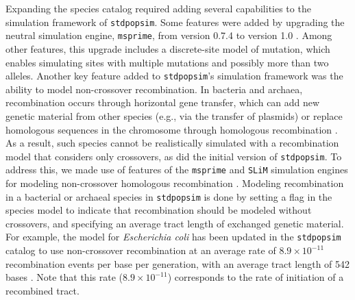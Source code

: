 \documentclass[hidelinks]{article}
\newcommand{\stdpopsim}{\texttt{stdpopsim}\xspace}
\begin{document}
Expanding the species catalog required adding several capabilities to the simulation framework of \stdpopsim.
Some features were added by upgrading the neutral simulation engine, \texttt{msprime}, from version 0.7.4 to version 1.0 \citep{Baumdicker2022}.
Among other features, this upgrade includes a discrete-site model of mutation,
which enables simulating sites with multiple mutations and possibly more than two alleles.
Another key feature added to \stdpopsim's simulation framework was the ability to model non-crossover recombination.
In bacteria and archaea, recombination occurs through horizontal gene transfer, which can add new genetic material from other species (e.g., via the transfer of plasmids) or replace homologous sequences in the chromosome through homologous recombination \citep{Thomas2005,Didelot2010,Gophna2022}.
As a result, such species cannot be realistically simulated with a recombination model that considers only crossovers,
as did the initial version of \stdpopsim.
To address this, we made use of features of the \texttt{msprime} and \texttt{SLiM} simulation engines for modeling non-crossover homologous recombination \citep{Cury2022}.
Modeling recombination in a bacterial or archaeal species in \stdpopsim is done by setting a flag in the species model to indicate that recombination should be modeled without crossovers,
and specifying an average tract length of exchanged genetic material.
For example, the model for \textit{Escherichia coli} has been updated in the \stdpopsim catalog to use non-crossover recombination at an average rate of $8.9\times 10^{-11}$ recombination events per base per generation,
with an average tract length of 542 bases \citep{Wielgoss2011,Didelot2012}.
Note that this rate ($8.9\times 10^{-11}$) corresponds to the rate of initiation of a recombined tract.
\end{document}
